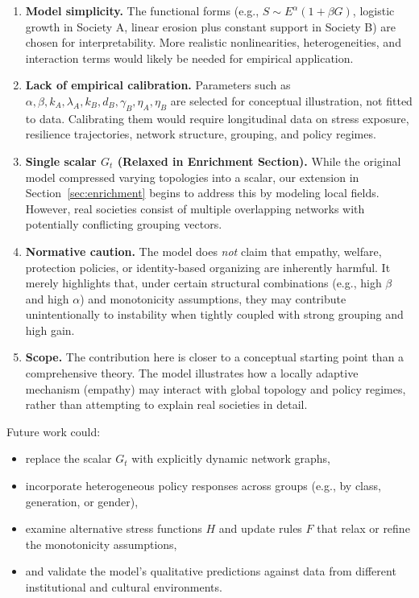 \documentclass[11pt]{article}
\theoremstyle{plain}
\begin{document}
\begin{enumerate}
  \item \textbf{Model simplicity.}  
  The functional forms (e.g., $S \sim E^\alpha(1+\beta G)$, logistic growth in Society A, linear erosion plus constant support in Society B) are chosen for interpretability.
  More realistic nonlinearities, heterogeneities, and interaction terms would likely be needed for empirical application.

  \item \textbf{Lack of empirical calibration.}  
  Parameters such as $\alpha, \beta, k_A, \lambda_A, k_B, d_B, \gamma_B, \eta_A, \eta_B$ are selected for conceptual illustration, not fitted to data.
  Calibrating them would require longitudinal data on stress exposure, resilience trajectories, network structure, grouping, and policy regimes.

  \item \textbf{Single scalar $G_t$ (Relaxed in Enrichment Section).}  
  While the original model compressed varying topologies into a scalar, our extension in Section~\ref{sec:enrichment} begins to address this by modeling local fields.
  However, real societies consist of multiple overlapping networks with potentially conflicting grouping vectors.

  \item \textbf{Normative caution.}  
  The model does \emph{not} claim that empathy, welfare, protection policies, or identity-based organizing are inherently harmful.
  It merely highlights that, under certain structural combinations (e.g., high $\beta$ and high $\alpha$) and monotonicity assumptions, they may contribute unintentionally to instability when tightly coupled with strong grouping and high gain.

  \item \textbf{Scope.}  
  The contribution here is closer to a conceptual starting point than a comprehensive theory.
  The model illustrates how a locally adaptive mechanism (empathy) may interact with global topology and policy regimes, rather than attempting to explain real societies in detail.
\end{enumerate}

Future work could:
\begin{itemize}
  \item replace the scalar $G_t$ with explicitly dynamic network graphs,
  \item incorporate heterogeneous policy responses across groups (e.g., by class, generation, or gender),
  \item examine alternative stress functions $H$ and update rules $F$ that relax or refine the monotonicity assumptions,
  \item and validate the model's qualitative predictions against data from different institutional and cultural environments.
\end{itemize}
\end{document}

